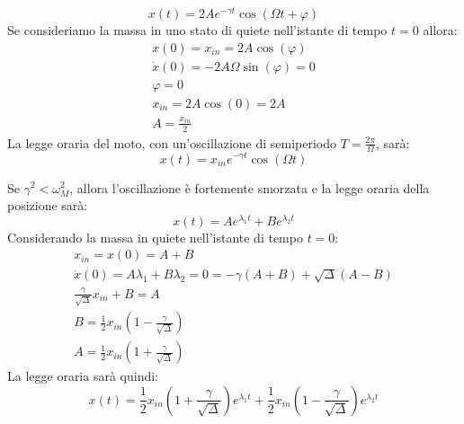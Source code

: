 \documentclass{article}
\numberwithin{equation}{subsection}
\begin{document}
\begin{equation}
    x(t)=2Ae^{-\gamma t}\cos\left(\Omega t +\varphi\right) 
\end{equation}
Se consideriamo la massa in uno stato di quiete nell'istante 
di tempo $t=0$ allora:
\begin{gather*}
    x(0)=x_{in}=2A\cos(\varphi)\\
    \dot x(0)=-2A\Omega \sin(\varphi)=0\\
    \varphi=0\\
    x_{in}=2A\cos(0)=2A\\
    A=\displaystyle\frac{x_{in}}{2}
\end{gather*}
La legge oraria del moto, con un'oscillazione di 
semiperiodo $T=\displaystyle\frac{2\pi}{\Omega}$, sarà: 
\begin{equation}
    x(t)=x_{in}e^{-\gamma t}\cos(\Omega t)
\end{equation}

\begin{center}\end{center}

Se $\gamma^{2}<\omega_M^{2}$, allora l'oscillazione è fortemente 
smorzata e la legge oraria della posizione sarà:
\begin{equation*}
    x(t)=Ae^{\lambda_1t}+Be^{\lambda_2t}
\end{equation*}
Considerando la massa in quiete nell'istante di tempo $t=0$: 
\begin{gather*}
    x_{in}=x(0)=A+B\\
    \dot x(0)=A\lambda_1+B\lambda_2=0=-\gamma(A+B)+\sqrt{\Delta}(A-B)\\
    \displaystyle\frac{\gamma}{\sqrt{\Delta}}x_{in}+B=A\\
    B=\displaystyle\frac{1}{2}x_{in}\left(1-\displaystyle\frac{\gamma}{\sqrt{\Delta}}\right)\\
    A=\displaystyle\frac{1}{2}x_{in}\left(1+\displaystyle\frac{\gamma}{\sqrt{\Delta}}\right)
\end{gather*}
La legge oraria sarà quindi:
\begin{equation}
    x(t)=\displaystyle\frac{1}{2}x_{in}\left(1+\displaystyle\frac{\gamma}{\sqrt{\Delta}}\right)e^{\lambda_1t}+\displaystyle\frac{1}{2}x_{in}\left(1-\displaystyle\frac{\gamma}{\sqrt{\Delta}}\right)e^{\lambda_2t}
\end{equation}
\end{document}
